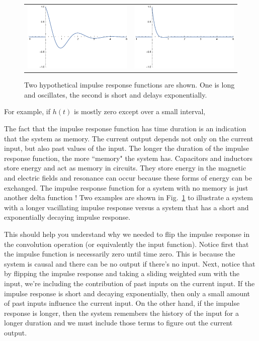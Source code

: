 \begin{figure}[tb]
\begin{tabular}{cc}
\includegraphics[width=.5\columnwidth]{impulse1_long.pdf} &
\includegraphics[width=.5\columnwidth]{impulse2_short.pdf} \\
\end{tabular}
\caption{Two hypothetical impulse response functions are shown.  One is long and oscillates, the second is short and delays exponentially.} \label{fig:memory}
\end{figure}

For example, if $h(t)$ is mostly zero except over a small interval, 

The fact that the impulse response function has time duration is an indication that the system as memory.  The current output depends not only on the current input, but also past values of the input.  The longer the duration of the impulse response function, the more ``memory" the system has.  Capacitors and inductors store energy and act as memory in circuits.  They store energy in the magnetic and electric fields and resonance can occur because these forms of energy can be exchanged.  The impulse response function for a system with no memory is just another delta function !  Two examples are shown in Fig.~\ref{fig:memory} to illustrate a system with a longer vacillating impulse response versus a system that has a short and exponentially decaying impulse response.  

This should help you understand why we needed to flip the impulse response in the convolution operation (or equivalently the input function).  Notice first that the impulse function is necessarily zero until time zero. This is because the system is causal and there can be no output if there's no input.  Next, notice that by flipping the impulse response and taking a sliding weighted sum with the input, we're including the contribution of past inputs on the current input.  If the impulse response is short and decaying exponentially, then only a small amount of past inputs influence the current input.  On the other hand, if the impulse response is longer, then the system remembers the history of the input for a longer duration and we must include those terms to figure out the current output.

